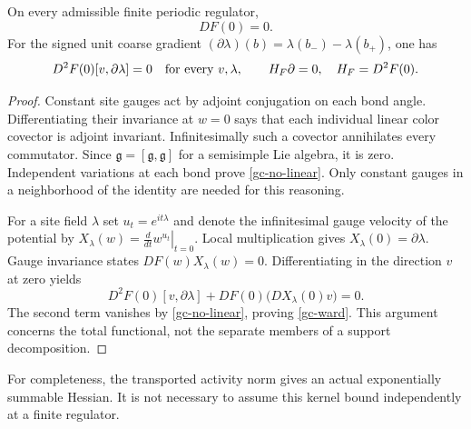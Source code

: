 \begin{theorem}\label{gc-ward-theorem}
On every admissible finite periodic regulator,
\begin{equation}\label{gc-no-linear}
 DF(0)=0.
\end{equation}
For the signed unit coarse gradient
$(\partial\lambda)(b)=\lambda(b_-)-\lambda(b_+)$, one has
\begin{equation}\label{gc-ward}
 D^2F(0)[v,\partial\lambda]=0
 \quad\hbox{for every }v,\lambda,
 \qquad H_F\partial=0,\quad H_F=D^2F(0).
\end{equation}
\end{theorem}
\begin{proof}
Constant site gauges act by adjoint conjugation on each bond
angle. Differentiating their invariance at $w=0$ says that each
individual linear color covector is adjoint invariant.
Infinitesimally such a covector annihilates every commutator.
Since $\mathfrak g=[\mathfrak g,\mathfrak g]$ for a semisimple
Lie algebra, it is zero. Independent variations at each bond
prove \eqref{gc-no-linear}. Only constant gauges in a neighborhood
of the identity are needed for this reasoning.

For a site field $\lambda$ set $u_t=e^{it\lambda}$ and denote
the infinitesimal gauge velocity of the potential by
$X_\lambda(w)=\left.\frac{d}{dt}w^{u_t}\right|_{t=0}$.
Local multiplication gives $X_\lambda(0)=\partial\lambda$.
Gauge invariance states $DF(w)X_\lambda(w)=0$.
Differentiating in the direction $v$ at zero yields
\[
 D^2F(0)[v,\partial\lambda]
          +DF(0)\bigl(DX_\lambda(0)v\bigr)=0.
\]
The second term vanishes by \eqref{gc-no-linear}, proving
\eqref{gc-ward}. This argument concerns the total functional,
not the separate members of a support decomposition.
\end{proof}

For completeness, the transported activity norm gives an actual
exponentially summable Hessian. It is not necessary to assume this
kernel bound independently at a finite regulator.

